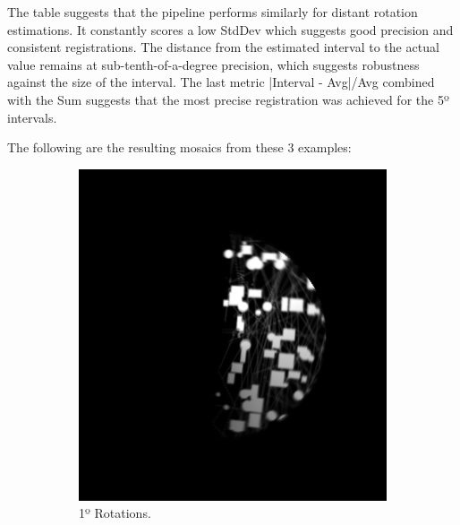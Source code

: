 The table suggests that the pipeline performs similarly for distant rotation estimations. It constantly scores a low StdDev which suggests good precision and consistent registrations. The distance from the estimated interval to the actual value remains at sub-tenth-of-a-degree precision, which suggests robustness against the size of the interval. The last metric |Interval - Avg|/Avg combined with the Sum suggests that the most precise registration was achieved for the 5º intervals.

The following are the resulting mosaics from these 3 examples:

\begin{figure}[H]
    \centering
    \begin{subfigure}[b]{.48\textwidth}
        \centering
        \includegraphics[height=\textwidth]{figures/results/Rotation-Combined/PC-1.png}
        \caption{1º Rotations.}
    \end{subfigure}
    \hfill
    \begin{subfigure}[b]{.48\textwidth}
        \centering

\end{subfigure}
\end{figure}
